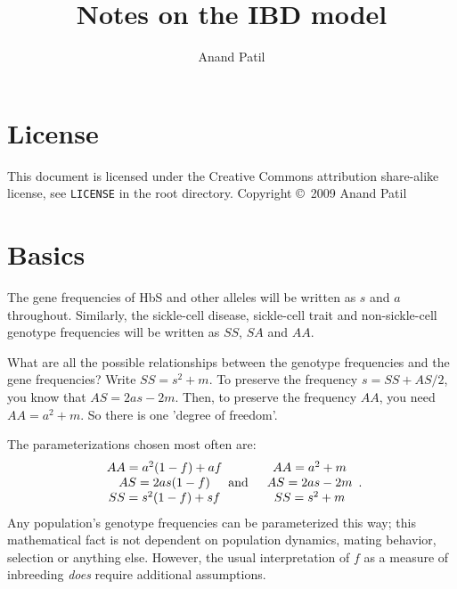 \documentclass[a4paper]{article}
\begin{document}
\title{Notes on the IBD model}
\author{Anand Patil}
\maketitle

\section{License} %
\label{sec:license}
This document is licensed under the Creative Commons attribution share-alike license, see \texttt{LICENSE} in the root directory. Copyright \copyright\ 2009 Anand Patil

\section{Basics} %
\label{sec:basics}

The gene frequencies of HbS and other alleles will be written as $s$ and $a$ throughout. Similarly, the sickle-cell disease, sickle-cell trait and non-sickle-cell genotype frequencies will be written as $SS$, $SA$ and $AA$.

What are all the possible relationships between the genotype frequencies and the gene frequencies? Write $SS=s^2+m$. To preserve the frequency $s=SS+AS/2$, you know that $AS=2as-2m$. Then, to preserve the frequency $AA$, you need $AA=a^2+m$. So there is one 'degree of freedom'.

The parameterizations chosen most often are:
\begin{eqnarray*}
\begin{array}{c}AA=a^2(1-f)+af\\AS=2as(1-f)\\SS=s^2(1-f)+sf\end{array} &\textup{and}&
\begin{array}{c}AA=a^2+m\\AS=2as-2m\\SS=s^2+m\end{array}.
\end{eqnarray*}
Any population's genotype frequencies can be parameterized this way; this mathematical fact is not dependent on population dynamics, mating behavior, selection or anything else. However, the usual interpretation of $f$ as a measure of inbreeding \emph{does} require additional assumptions. 
\end{document}
